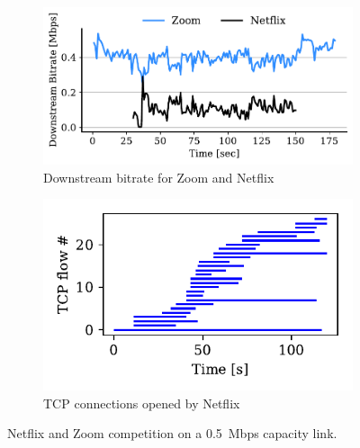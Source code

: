 \begin{figure}[t!]
\centering
\begin{subfigure}[t]{.4\textwidth}
    \centering
    \includegraphics[width=1\textwidth]{figures/comp_ts/zoom_netflix_0.5_dl_r1.pdf}
    \caption{Downstream bitrate for Zoom and Netflix}
    \label{subfig:comp_zoom_netflix_bitrate}
\end{subfigure}\hfill
\begin{subfigure}[t]{.4\textwidth}
    \centering
    \includegraphics[width=1\textwidth]{figures/comp/netflix_connection_0_5.pdf}
    \caption{TCP connections opened by Netflix}
    \label{subfig:comp_netflix_conn}
\end{subfigure}
\caption{Netflix and Zoom competition on a 0.5~Mbps capacity link.}
\label{fig:comp_netflix_zoom}
\end{figure}
